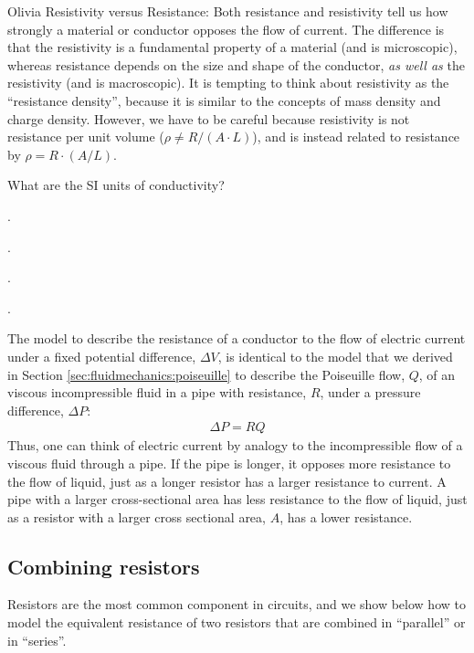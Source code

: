 \begin{studentOpinion}{Olivia}
Resistivity versus Resistance: Both resistance and resistivity tell us how strongly a material or conductor opposes the flow of current. The difference is that the resistivity is a fundamental property of a material (and is microscopic), whereas resistance depends on the size and shape of the conductor, \textit{as well as} the resistivity (and is macroscopic). It is tempting to think about resistivity as the ``resistance density'', because it is similar to the concepts of mass density and charge density. However, we have to be careful because resistivity is not resistance per unit volume ($\rho \neq R/(A\cdot L)$), and is instead related to resistance by $\rho=R\cdot (A/L)$.


\end{studentOpinion}

\begin{checkpoint}
	\begin{MCquestion}{What are the SI units of conductivity?}
		\item \SI{}{}.
		\item \SI{}{}. \correct
		\item \SI{}{}.
		\item \SI{}{}.
	\end{MCquestion}
\end{checkpoint}


The model to describe the resistance of a conductor to the flow of electric current under a fixed potential difference, $\Delta V$, is identical to the model that we derived in Section \ref{sec:fluidmechanics:poiseuille} to describe the Poiseuille flow, $Q$, of an viscous incompressible fluid in a pipe with resistance, $R$, under a pressure difference, $\Delta P$:
\begin{align*}
\Delta P = RQ
\end{align*}
Thus, one can think of electric current by analogy to the incompressible flow of a viscous fluid through a pipe. If the pipe is longer, it opposes more resistance to the flow of liquid, just as a longer resistor has a larger resistance to current. A pipe with a larger cross-sectional area has less resistance to the flow of liquid, just as a resistor with a larger cross sectional area, $A$, has a lower resistance.
\subsection{Combining resistors}
Resistors are the most common component in circuits, and we show below how to model the equivalent resistance of two resistors that are combined in ``parallel'' or in ``series''.

